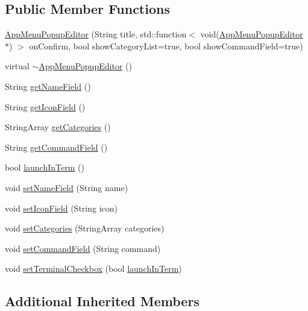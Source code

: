 \subsection*{Public Member Functions}
\begin{DoxyCompactItemize}
\item 
\mbox{\hyperlink{classAppMenuPopupEditor_a7741f1af98bb41674a4e85fbf518ffc6}{App\+Menu\+Popup\+Editor}} (String title, std\+::function$<$ void(\mbox{\hyperlink{classAppMenuPopupEditor}{App\+Menu\+Popup\+Editor}} $\ast$) $>$ on\+Confirm, bool show\+Category\+List=true, bool show\+Command\+Field=true)
\item 
virtual \mbox{\hyperlink{classAppMenuPopupEditor_adc280e5e6bca40a687ca7f03e5d40637}{$\sim$\+App\+Menu\+Popup\+Editor}} ()
\item 
String \mbox{\hyperlink{classAppMenuPopupEditor_a3fd8f686ba239fb51bfbc2ef20b5f750}{get\+Name\+Field}} ()
\item 
String \mbox{\hyperlink{classAppMenuPopupEditor_af8cbacf3c88652bf3862650fab2e5674}{get\+Icon\+Field}} ()
\item 
String\+Array \mbox{\hyperlink{classAppMenuPopupEditor_a8874c19cbf5d9a0d8ac444fa5ba93787}{get\+Categories}} ()
\item 
String \mbox{\hyperlink{classAppMenuPopupEditor_ad7c3a99952d32f0f7545bc642cb17565}{get\+Command\+Field}} ()
\item 
bool \mbox{\hyperlink{classAppMenuPopupEditor_ab3a31014001312e2280f1c7b8e0e50f0}{launch\+In\+Term}} ()
\item 
void \mbox{\hyperlink{classAppMenuPopupEditor_a14e47971d8a45d26199ef076bf163eee}{set\+Name\+Field}} (String name)
\item 
void \mbox{\hyperlink{classAppMenuPopupEditor_a7ff894257d04bf4c5a643dfc796cbbf8}{set\+Icon\+Field}} (String icon)
\item 
void \mbox{\hyperlink{classAppMenuPopupEditor_a8edb399ea0db5f0d6f5e5f0b4fa4dd68}{set\+Categories}} (String\+Array categories)
\item 
void \mbox{\hyperlink{classAppMenuPopupEditor_aff3cb0549f7ecd2aa7c0a18851f7e65f}{set\+Command\+Field}} (String command)
\item 
void \mbox{\hyperlink{classAppMenuPopupEditor_a630ae664010e259b64879642e637a4d2}{set\+Terminal\+Checkbox}} (bool \mbox{\hyperlink{classAppMenuPopupEditor_ab3a31014001312e2280f1c7b8e0e50f0}{launch\+In\+Term}})
\end{DoxyCompactItemize}
\subsection*{Additional Inherited Members}


